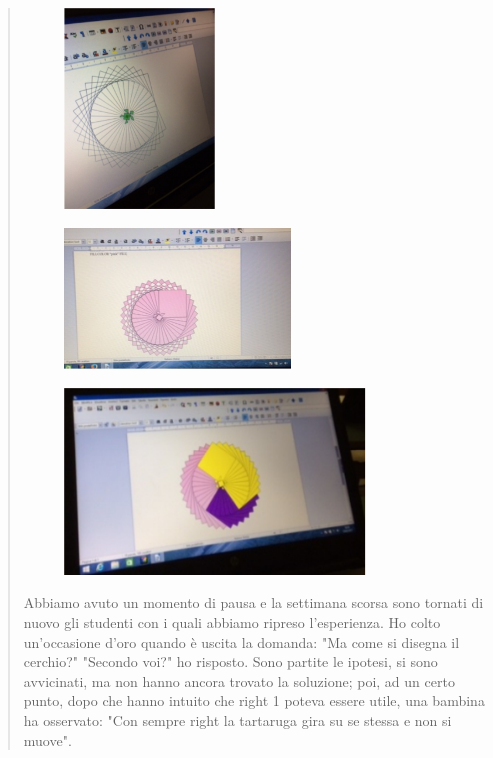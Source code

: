 \begin{quote}
\begin{minipage}{0.35\textwidth}
\begin{figure}[H]
   \includegraphics[width=4.0cm,trim=4 4 6 4,clip]{./images/cerchio/PiccolomanualeLibreLogo5-img4a.png}
   \label{cer-3}
\end{figure}
\end{minipage} \hfill
\begin{minipage}{0.7\textwidth}
\begin{figure}[H]
   \includegraphics[width=6.0cm,trim=4 4 6 4,clip]{./images/cerchio/PiccolomanualeLibreLogo5-img4b.png}
   \label{cer-4}
\end{figure}
\end{minipage} \hfill
\begin{figure}[H]
   \centering
   \includegraphics[width=8.0cm,trim=4 4 6 4,clip]{./images/cerchio/PiccolomanualeLibreLogo5-img4c.png}
   \label{cer-5}
\end{figure}

Abbiamo avuto un momento di pausa e la settimana scorsa sono tornati di nuovo gli studenti con i quali abbiamo ripreso l'esperienza. Ho colto un'occasione d'oro quando è uscita la domanda: "Ma come si disegna il cerchio?" 
"Secondo voi?" ho risposto.
Sono partite le ipotesi, si sono avvicinati, ma non hanno ancora trovato la soluzione; poi, ad un certo punto, dopo che hanno intuito che right 1 poteva essere utile, una bambina ha osservato: "Con sempre right la tartaruga gira su se stessa e non si muove".


\end{quote}
